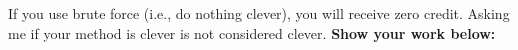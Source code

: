 \documentclass[letterpaper]{article}
\newcommand{\real}{\mathbb R}  %
\newcommand{\spanof}[1]{\textrm{span} \{ #1 \}}
\begin{document}
If you use brute force (i.e., do nothing clever), you will receive zero credit. Asking me if your method is clever is not considered clever. \textbf{Show your work below:}

%
%
%
%
%
%



\end{document}
